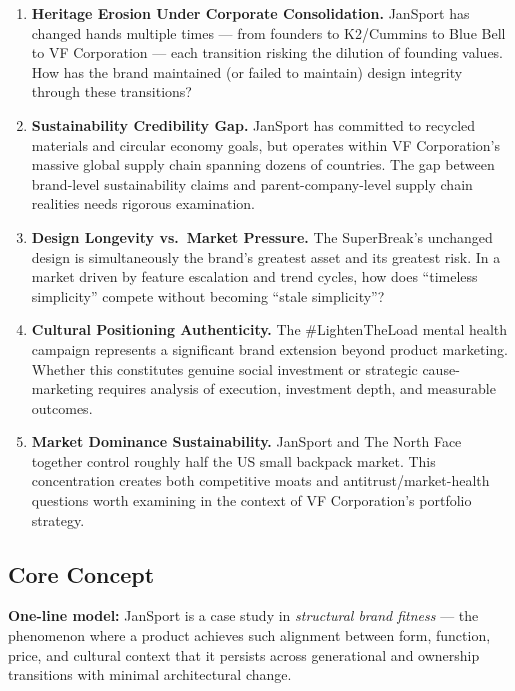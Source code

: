 \documentclass[11pt,letterpaper]{article}
\begin{document}
\begin{enumerate}[label=\textbf{\arabic*.}]
  \item \textbf{Heritage Erosion Under Corporate Consolidation.} JanSport has changed hands multiple times --- from founders to K2/Cummins to Blue Bell to VF Corporation --- each transition risking the dilution of founding values. How has the brand maintained (or failed to maintain) design integrity through these transitions?

  \item \textbf{Sustainability Credibility Gap.} JanSport has committed to recycled materials and circular economy goals, but operates within VF Corporation's massive global supply chain spanning dozens of countries. The gap between brand-level sustainability claims and parent-company-level supply chain realities needs rigorous examination.

  \item \textbf{Design Longevity vs.\ Market Pressure.} The SuperBreak's unchanged design is simultaneously the brand's greatest asset and its greatest risk. In a market driven by feature escalation and trend cycles, how does ``timeless simplicity'' compete without becoming ``stale simplicity''?

  \item \textbf{Cultural Positioning Authenticity.} The \#LightenTheLoad mental health campaign represents a significant brand extension beyond product marketing. Whether this constitutes genuine social investment or strategic cause-marketing requires analysis of execution, investment depth, and measurable outcomes.

  \item \textbf{Market Dominance Sustainability.} JanSport and The North Face together control roughly half the US small backpack market. This concentration creates both competitive moats and antitrust/market-health questions worth examining in the context of VF Corporation's portfolio strategy.
\end{enumerate}

\subsection{Core Concept}

\begin{quotebox}
\textbf{One-line model:} JanSport is a case study in \textit{structural brand fitness} --- the phenomenon where a product achieves such alignment between form, function, price, and cultural context that it persists across generational and ownership transitions with minimal architectural change.
\end{quotebox}
\end{document}
